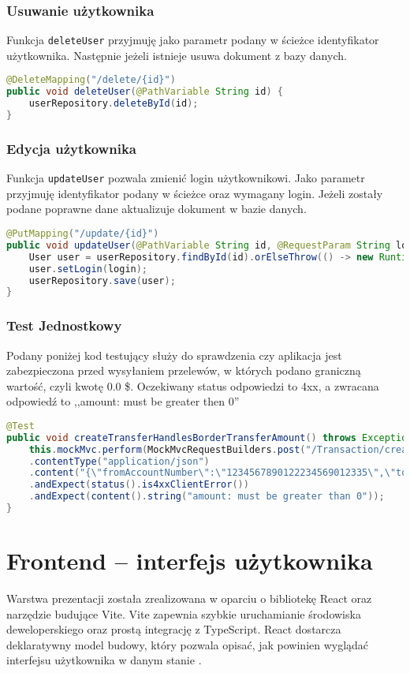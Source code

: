 \subsubsection*{Usuwanie użytkownika}
Funkcja \texttt{deleteUser} przyjmuję jako parametr podany w ścieżce identyfikator użytkownika. Następnie jeżeli istnieje usuwa dokument z bazy danych.
\begin{lstlisting}[language={Java}, caption={Usuwanie użytkownika}, label={lst:java-delete}]
@DeleteMapping("/delete/{id}")
public void deleteUser(@PathVariable String id) {
	userRepository.deleteById(id);
}
\end{lstlisting}
\subsubsection*{Edycja użytkownika}
Funkcja \texttt{updateUser} pozwala zmienić login użytkownikowi. Jako parametr przyjmuję identyfikator podany w ścieżce oraz wymagany login. Jeżeli zostały podane poprawne dane aktualizuje dokument w bazie danych.
\begin{lstlisting}[language={Java}, caption={Edycja użytkownika}, label={lst:java-update}]
@PutMapping("/update/{id}")
public void updateUser(@PathVariable String id, @RequestParam String login) {
	User user = userRepository.findById(id).orElseThrow(() -> new RuntimeException("User not found"));
	user.setLogin(login);
	userRepository.save(user);
}
\end{lstlisting}
\subsubsection*{Test Jednostkowy}
Podany poniżej kod testujący służy do sprawdzenia czy aplikacja jest zabezpieczona przed wysyłaniem przelewów, w których podano graniczną wartość, czyli kwotę 0.0 \$. Oczekiwany status odpowiedzi to 4xx, a zwracana odpowiedź to ,,amount: must be greater then 0''
\begin{lstlisting}[language={Java}, caption={Przykładowy test}, label={lst:java-UnitTest}]
@Test
public void createTransferHandlesBorderTransferAmount() throws Exception {
	this.mockMvc.perform(MockMvcRequestBuilders.post("/Transaction/create/transfer")
	.contentType("application/json")
	.content("{\"fromAccountNumber\":\"1234567890122234569012335\",\"toAccountNumber\":\"1234567890122234569012335\",\"amount\":0.0}"))
	.andExpect(status().is4xxClientError())
	.andExpect(content().string("amount: must be greater than 0"));
}
\end{lstlisting}
\section{Frontend – interfejs użytkownika}
Warstwa prezentacji została zrealizowana w oparciu o bibliotekę React oraz narzędzie budujące Vite. Vite zapewnia szybkie uruchamianie środowiska deweloperskiego oraz prostą integrację z TypeScript. React dostarcza deklaratywny model budowy, który pozwala opisać, jak powinien wyglądać interfejsu użytkownika w danym stanie \cite{Declarative}. 
